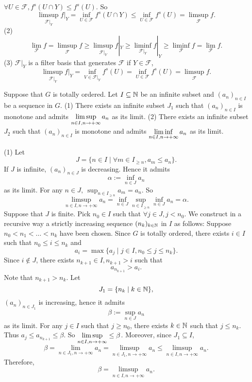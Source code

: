 \begin{proofenv}
    \quad 
    \newline
    $\forall U\in \mathcal{F}, f^s(U\cap Y)\le f^s(U)$. So 
    $$\limsup_{\mathcal{F}|_Y}f|_Y=\inf_{U\in \mathcal{F}}f^s(U\cap Y)\le\inf_{U\in \mathcal{F}}f^s(U)= \limsup_{\mathcal{F}}f.$$
    (2) $$\lim_{\mathcal{F}}f=\limsup_{\mathcal{F}}f\ge\limsup_{\mathcal{F}|_Y}f|_Y\ge \liminf_{\mathcal{F}|_Y}f|_Y\ge \liminf_{\mathcal{F}}f=\lim_{\mathcal{F}}f.$$
    (3) $\mathcal{F}|_Y$ is a filter basis that generates $\mathcal{F}$ if $Y\in \mathcal{F}$,
    $$\limsup_{\mathcal{F}|_Y}f|_Y=\inf_{V\in \mathcal{F}|_Y}f^s(U)=\inf_{U\in \mathcal{F}}f^s(U)=\limsup_{\mathcal{F}}f.$$
\end{proofenv}
\begin{theoremenv}
   Suppose that $G$ is totally ordered. Let $I\subseteq \mathbb{N}$  be an infinite subset and $(a_n)_{n\in I}$ be a sequence in $G$.
   \newline
   (1) There exists an infinite subset $J_1$ such that $(a_n)_{n\in I}$ is monotone and admits $\displaystyle\limsup_{n\in I,n\rightarrow +\infty}a_n$ as its limit.
   \newline
   (2) There exists an infinite subset $J_2$ such that $(a_n)_{n\in I}$ is monotone and admits $\displaystyle\liminf_{n\in I,n\rightarrow +\infty}a_n$ as its limit.
    
\end{theoremenv}
\begin{proofenv}
    \quad\newline
    (1) Let 
    $$J=\{n\in I\mid \forall m\in I_{\ge n},a_m\le a_n\}.$$
    If $J$ is infinite, $(a_n)_{n\in J}$ is decreasing. Hence it admits
    $$\alpha:=\inf_{n\in J}a_n$$
    as its limit. For any $n\in J,\ \sup_{n\in I_{\ge n}}a_m=a_n$. So 
    $$\limsup_{n\in I,n\rightarrow+\infty}a_n=\inf_{n\in J}\sup_{n\in I_{\ge n}}\inf_{n\in J}a_n=\alpha.$$
    Suppose that $J$ is finite. Pick $n_0\in I $ such that $\forall j\in J,j<n_0$. We construct  in a recursive way a strictly increasing sequence $(n_k)_{k\in \mathbb{N}}$ in $I$ as follows: Suppose $n_0<n_1<\dots<n_k$ have been chosen. Since $G$ is totally ordered, there exists $i\in I$ such that $n_0\le i\le n_k$ and 
    $$a_i=\max\{a_j\mid j\in I,n_0\le j\le n_k\}.$$
    Since $i\notin J$, there exists $n_{k+1}\in I, n_{k+1}>i$ such that 
    $$a_{n_{k+1}}>a_i.$$
    Note that $n_{k+1}>n_k$. Let 
    $$J_1=\{n_{k}\mid k\in \mathbb{N}\},$$
    $(a_n)_{n\in J_1}$ is increasing, hence it admits 
    $$\beta:=\sup_{n\in J}a_n$$
    as its limit. For any $j\in I$ such that $j\ge n_0$, there exists $k\in \mathbb{N}$ such that $j\le n_k$. Thus $a_j\le a_{n_{k+1}}\le \beta$. So $\displaystyle\limsup_{n\in I,n\rightarrow+\infty}\le \beta$. Moreover, since $J_1\subseteq I$, 
    $$\beta=\lim_{n\in J_1,n\rightarrow+\infty}a_n=\limsup_{n\in J_1,n\rightarrow +\infty}a_n\le\limsup_{n\in I,n\rightarrow +\infty}a_n.$$
    Therefore,
    $$\beta=\limsup_{n\in I,n\rightarrow+\infty}a_n.$$
\end{proofenv}





